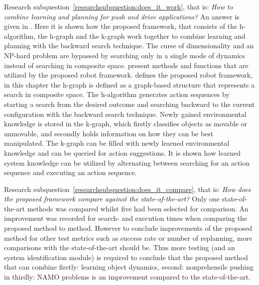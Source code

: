 Research subquestion~\ref{researchsubquestion:does_it_work}, that is: \textit{How to combine learning and planning for push and drive applications?} An answer is given in . Here it is shown how the proposed framework, that consists of the \acf{h-algorithm}, the \acf{h-graph} and the \acf{k-graph} work together to combine learning and planning with the backward search technique. The curse of dimensionality and an \ac{NP-hard} problem are bypassed by searching only in a single mode of dynamics instead of searching in composite space.  present methods and functions that are utilized by the proposed robot framework.  defines the proposed robot framework, in this chapter the \ac{h-graph} is defined as a graph-based structure that represents a search in composite space. The \ac{h-algorithm} generates action sequences by starting a search from the desired outcome and searching backward to the current configuration with the backward search technique. Newly gained environmental knowledge is stored in the \ac{k-graph}, which firstly classifies objects as movable or unmovable, and secondly holds information on how they can be best manipulated. The \ac{k-graph} can be filled with newly learned environmental knowledge and can be queried for action suggestions. It is shown how learned system knowledge can be utilized by alternating between searching for an action sequence and executing an action sequence.\bs

Research subquestion~\ref{researchsubquestion:does_it_compare}, that is: \textit{How does the proposed framework compare against the state-of-the-art?} Only one state-of-the-art methods was compared whilst five had been selected for comparison. An improvement was recorded for search- and execution times when comparing the proposed method to \citeauthor{wang_affordancebased_2020} method. However to conclude improvements of the proposed method for other test metrics such as success rate or number of replanning, more comparisons with the state-of-the-art should be. Thus more testing (and an system identification module) is required to conclude that the proposed method that can combine firstly: learning object dynamics, second: nonprehensile pushing in thirdly: \ac{NAMO} problems is an improvement compared to the state-of-the-art.\bs

